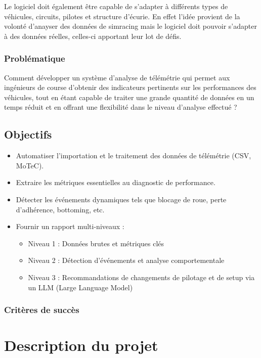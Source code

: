 \documentclass[a4paper,12pt]{report}
\begin{document}
Le logiciel doit également être capable de s'adapter à différents types de véhicules, circuits, pilotes et structure d'écurie. En effet l'idée provient de la volonté d'anayser des données de simracing mais le logiciel doit pouvoir s'adapter à des données réelles, celles-ci apportant leur lot de défis.

\subsection{Problématique}

Comment développer un système d'analyse de télémétrie qui permet aux ingénieurs de course d'obtenir des indicateurs pertinents sur les performances des véhicules, tout en étant capable de traiter une grande quantité de données en un temps réduit et en offrant une flexibilité dans le niveau d'analyse effectué ?

\section{Objectifs}

\begin{itemize}
    \item Automatiser l'importation et le traitement des données de télémétrie (CSV, MoTeC).
    \item Extraire les métriques essentielles au diagnostic de performance.
    \item Détecter les événements dynamiques tels que blocage de roue, perte d'adhérence, bottoming, etc.
    \item Fournir un rapport multi-niveaux :
    \begin{itemize}
        \item Niveau 1 : Données brutes et métriques clés
        \item Niveau 2 : Détection d’événements et analyse comportementale
        \item Niveau 3 : Recommandations de changements de pilotage et de setup via un LLM (Large Language Model)
    \end{itemize}
\end{itemize}

\subsection{Critères de succès}

\chapter{Description du projet}
\end{document}
